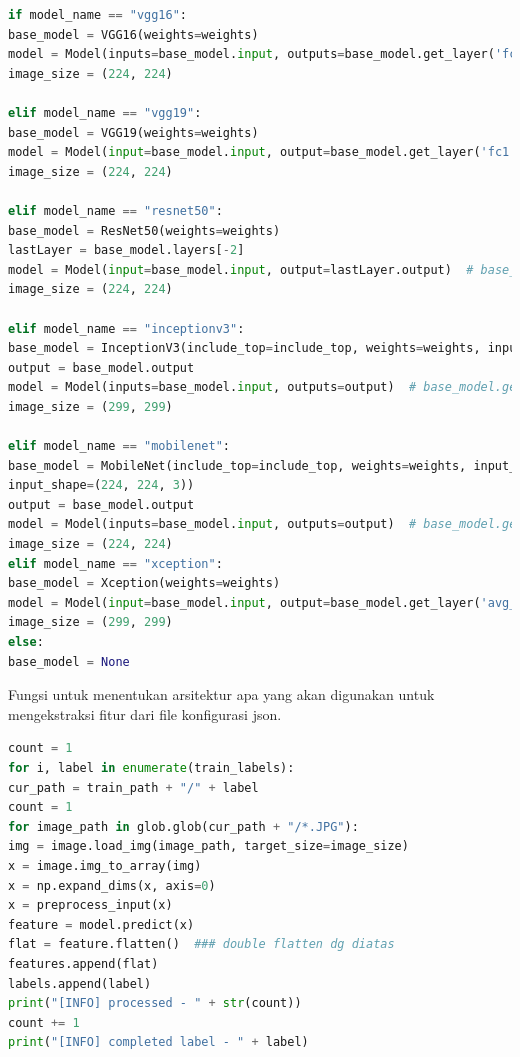 \begin{lstlisting}[language=python, caption=Menentukan arsitektur untuk ekstraksi fitur, label=code:choose_architecture, firstnumber=58]
if model_name == "vgg16":
base_model = VGG16(weights=weights)
model = Model(inputs=base_model.input, outputs=base_model.get_layer('fc1').output)
image_size = (224, 224)

elif model_name == "vgg19":
base_model = VGG19(weights=weights)
model = Model(input=base_model.input, output=base_model.get_layer('fc1').output)
image_size = (224, 224)

elif model_name == "resnet50":
base_model = ResNet50(weights=weights)
lastLayer = base_model.layers[-2]
model = Model(input=base_model.input, output=lastLayer.output)  # base_model.get_layer('custom').output)
image_size = (224, 224)

elif model_name == "inceptionv3":
base_model = InceptionV3(include_top=include_top, weights=weights, input_tensor=Input(shape=(299, 299, 3)))
output = base_model.output
model = Model(inputs=base_model.input, outputs=output)  # base_model.get_layer('custom').output)
image_size = (299, 299)

elif model_name == "mobilenet":
base_model = MobileNet(include_top=include_top, weights=weights, input_tensor=Input(shape=(224, 224, 3)),
input_shape=(224, 224, 3))
output = base_model.output
model = Model(inputs=base_model.input, outputs=output)  # base_model.get_layer('custom').output)
image_size = (224, 224)
elif model_name == "xception":
base_model = Xception(weights=weights)
model = Model(input=base_model.input, output=base_model.get_layer('avg_pool').output)
image_size = (299, 299)
else:
base_model = None
\end{lstlisting}
\par Fungsi untuk menentukan arsitektur apa yang akan digunakan untuk mengekstraksi fitur dari file konfigurasi json.

\begin{lstlisting}[language=python, caption=Preproses Data, label=code:preprocess, firstnumber=123]
count = 1
for i, label in enumerate(train_labels):
cur_path = train_path + "/" + label
count = 1
for image_path in glob.glob(cur_path + "/*.JPG"):
img = image.load_img(image_path, target_size=image_size)
x = image.img_to_array(img)
x = np.expand_dims(x, axis=0)
x = preprocess_input(x)
feature = model.predict(x)
flat = feature.flatten()  ### double flatten dg diatas
features.append(flat)
labels.append(label)
print("[INFO] processed - " + str(count))
count += 1
print("[INFO] completed label - " + label)
\end{lstlisting} 

